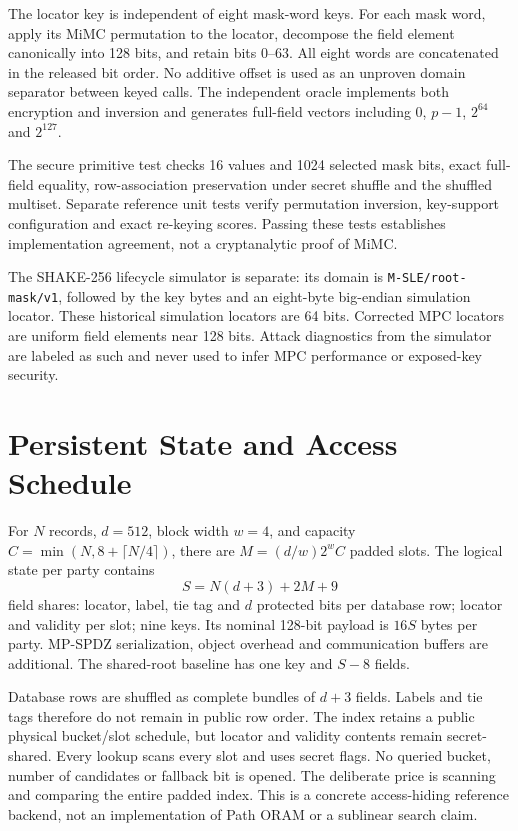 \documentclass[journal,onecolumn]{IEEEtran}
\begin{document}
The locator key is independent of eight mask-word keys. For each mask word, apply its MiMC permutation to the locator, decompose the field element canonically into 128 bits, and retain bits 0--63. All eight words are concatenated in the released bit order. No additive offset is used as an unproven domain separator between keyed calls. The independent oracle implements both encryption and inversion and generates full-field vectors including $0$, $p-1$, $2^{64}$ and $2^{127}$.

The secure primitive test checks 16 values and 1024 selected mask bits, exact full-field equality, row-association preservation under secret shuffle and the shuffled multiset. Separate reference unit tests verify permutation inversion, key-support configuration and exact re-keying scores. Passing these tests establishes implementation agreement, not a cryptanalytic proof of MiMC.

The SHAKE-256 lifecycle simulator is separate: its domain is \texttt{M-SLE/root-mask/v1}, followed by the key bytes and an eight-byte big-endian simulation locator. These historical simulation locators are 64 bits. Corrected MPC locators are uniform field elements near 128 bits. Attack diagnostics from the simulator are labeled as such and never used to infer MPC performance or exposed-key security.

\section{Persistent State and Access Schedule}\label{suppsec:supplement:3}
For $N$ records, $d=512$, block width $w=4$, and capacity $C=\min(N,8+\lceil N/4\rceil)$, there are $M=(d/w)2^wC$ padded slots. The logical state per party contains
\[
S=N(d+3)+2M+9
\]
field shares: locator, label, tie tag and $d$ protected bits per database row; locator and validity per slot; nine keys. Its nominal 128-bit payload is $16S$ bytes per party. MP-SPDZ serialization, object overhead and communication buffers are additional. The shared-root baseline has one key and $S-8$ fields.

Database rows are shuffled as complete bundles of $d+3$ fields. Labels and tie tags therefore do not remain in public row order. The index retains a public physical bucket/slot schedule, but locator and validity contents remain secret-shared. Every lookup scans every slot and uses secret flags. No queried bucket, number of candidates or fallback bit is opened. The deliberate price is scanning and comparing the entire padded index. This is a concrete access-hiding reference backend, not an implementation of Path ORAM or a sublinear search claim.
\end{document}
